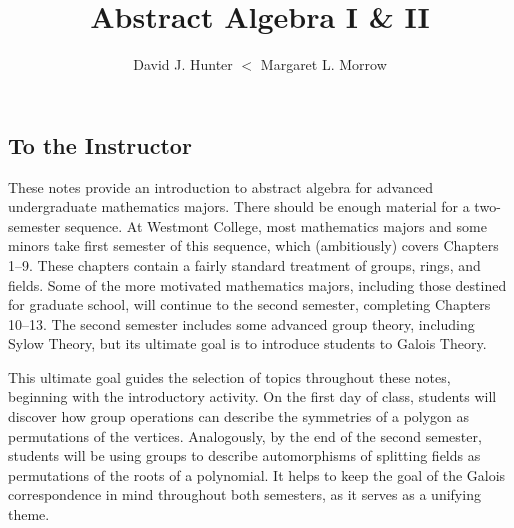 
%
\usepackage{graphicx}
%
\InstructorVersion
%


\large
\frontmatter
\title{Abstract Algebra I \& II}
\author{David J. Hunter $<$ Margaret L. Morrow}
\maketitle
\tableofcontents


\begin{annotation}
 \chapter{To the Instructor}

These notes provide an introduction to abstract algebra for advanced undergraduate mathematics majors. There should be enough material for a two-semester sequence. At Westmont College, most mathematics majors and some minors take first semester of this sequence, which (ambitiously) covers Chapters 1--9. These chapters contain a fairly standard treatment of groups, rings, and fields. Some of the more motivated mathematics majors, including those destined for graduate school, will continue to the second semester, completing Chapters 10--13. The second semester includes some advanced group theory, including Sylow Theory, but its ultimate goal is to introduce students to Galois Theory.

This ultimate goal guides the selection of topics throughout these notes, beginning with the introductory activity. On the first day of class, students will discover how group operations can describe the symmetries of a polygon as permutations of the vertices. Analogously, by the end of the second semester, students will be using groups to describe automorphisms of splitting fields as permutations of the roots of a polynomial. It helps to keep the goal of the Galois correspondence in mind throughout both semesters, as it serves as a unifying theme.


\end{annotation}
